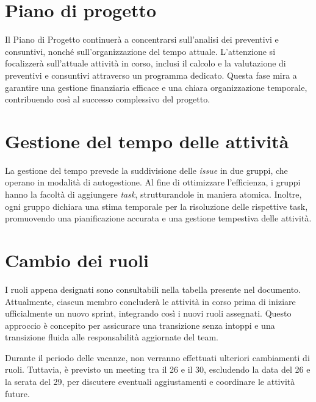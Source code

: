\section{Piano di progetto}
Il Piano di Progetto continuerà a concentrarsi sull'analisi dei preventivi e consuntivi, 
nonché sull'organizzazione del tempo attuale. L'attenzione si focalizzerà sull'attuale attività in corso, 
inclusi il calcolo e la valutazione di preventivi e consuntivi attraverso un programma dedicato. 
Questa fase mira a garantire una gestione finanziaria efficace e una chiara organizzazione temporale, 
contribuendo così al successo complessivo del progetto.


\section{Gestione del tempo delle attività}
La gestione del tempo prevede la suddivisione delle \textit{issue} in due gruppi, che operano in modalità di autogestione.
Al fine di ottimizzare l'efficienza, i gruppi hanno la facoltà di aggiungere \textit{task}, strutturandole in maniera atomica. 
Inoltre, ogni gruppo dichiara una stima temporale per la risoluzione delle rispettive task, 
promuovendo una pianificazione accurata e una gestione tempestiva delle attività.


\section{Cambio dei ruoli}
I ruoli appena designati sono consultabili nella tabella presente nel documento. 
Attualmente, ciascun membro concluderà le attività in corso prima di iniziare ufficialmente un nuovo sprint, 
integrando così i nuovi ruoli assegnati. Questo approccio è concepito per assicurare una transizione senza intoppi 
e una transizione fluida alle responsabilità aggiornate del team.

Durante il periodo delle vacanze, non verranno effettuati ulteriori cambiamenti di ruoli. 
Tuttavia, è previsto un meeting tra il 26 e il 30, escludendo la data del 26 e la serata del 29, 
per discutere eventuali aggiustamenti e coordinare le attività future.